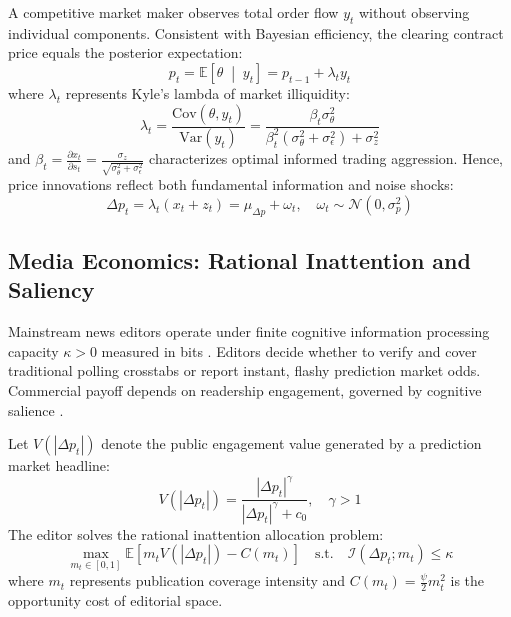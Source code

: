 \documentclass[12pt, a4paper]{article}
\begin{document}
A competitive market maker observes total order flow $y_t$ without observing individual components. Consistent with Bayesian efficiency, the clearing contract price equals the posterior expectation:
\begin{equation}
p_t = \mathbb{E}\left[\theta \;\middle|\; y_t\right] = p_{t-1} + \lambda_t y_t
\end{equation}
where $\lambda_t$ represents Kyle's lambda of market illiquidity:
\begin{equation}
\lambda_t = \frac{\text{Cov}(\theta, y_t)}{\text{Var}(y_t)} = \frac{\beta_t \sigma_\theta^2}{\beta_t^2 (\sigma_\theta^2 + \sigma_\epsilon^2) + \sigma_z^2}
\end{equation}
and $\beta_t = \frac{\partial x_t}{\partial s_t} = \frac{\sigma_z}{\sqrt{\sigma_\theta^2 + \sigma_\epsilon^2}}$ characterizes optimal informed trading aggression. Hence, price innovations reflect both fundamental information and noise shocks:
\begin{equation}
\Delta p_t = \lambda_t (x_t + z_t) = \mu_{\Delta p} + \omega_t, \quad \omega_t \sim \mathcal{N}(0, \sigma_p^2)
\end{equation}

\subsection{Media Economics: Rational Inattention and Saliency}
Mainstream news editors operate under finite cognitive information processing capacity $\kappa > 0$ measured in bits \citep{Sims2003}. Editors decide whether to verify and cover traditional polling crosstabs or report instant, flashy prediction market odds. Commercial payoff depends on readership engagement, governed by cognitive salience \citep{Bordalo2013}.

Let $V(|\Delta p_t|)$ denote the public engagement value generated by a prediction market headline:
\begin{equation}
V(|\Delta p_t|) = \frac{|\Delta p_t|^\gamma}{|\Delta p_t|^\gamma + c_0}, \quad \gamma > 1
\end{equation}
The editor solves the rational inattention allocation problem:
\begin{equation}
\max_{m_t \in [0, 1]} \mathbb{E}\left[ m_t V(|\Delta p_t|) - C(m_t) \right] \quad \text{s.t.} \quad \mathcal{I}(\Delta p_t; m_t) \le \kappa
\end{equation}
where $m_t$ represents publication coverage intensity and $C(m_t) = \frac{\psi}{2} m_t^2$ is the opportunity cost of editorial space.
\end{document}
